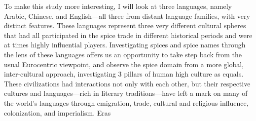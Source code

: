 To make this study more interesting, I will look at three languages, namely Arabic, Chinese, and English---all three from distant language families, with very distinct features. These languages represent three very different cultural spheres that had all participated in the spice trade in different historical periods and were at times highly influential players. Investigating spices and spice names through the lens of these languages offers us an opportunity to take step back from the usual Eurocentric viewpoint, and observe the spice domain from a more global, inter-cultural approach, investigating 3 pillars of human high culture as equals. These civilizations had interactions not only with each other, but their respective cultures and languages---rich in literary traditions---have left a mark on many of the world's languages through emigration, trade, cultural and religious influence, colonization, and imperialism. Eras

